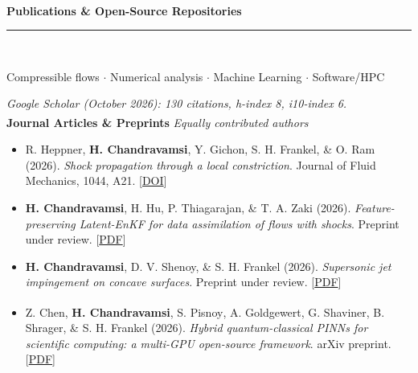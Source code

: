 \ \\[2mm]
\noindent \textbf{\large{Publications \& Open-Source Repositories}}\\[-2.5mm]
\noindent\rule{\textwidth}{0.4pt} \\[-5mm]
\begin{center}
    \noindent {} Compressible flows $\cdot$
     Numerical analysis $\cdot$ 
     Machine Learning $\cdot$
     Software/HPC \\
\end{center}

\noindent \textit{Google Scholar (October 2026): 130 citations, h-index 8, i10-index 6.}\\[0.5mm]

\noindent \textbf{Journal Articles \& Preprints} \hfill \textsuperscript{\textdagger}\textit{Equally contributed authors} \\

\begin{itemize}[itemsep=0pt, topsep=5pt, label=]
    \item R. Heppner, \textbf{H. Chandravamsi}, Y. Gichon, S. H. Frankel, \& O. Ram (2026). \textit{Shock propagation through a local constriction}. Journal of Fluid Mechanics, 1044, A21. [\href{https://doi.org/10.1017/jfm.2026.12130}{DOI}]
\end{itemize}

\begin{itemize}[itemsep=0pt, topsep=5pt, label=]
    \item \textbf{H. Chandravamsi}, H. Hu, P. Thiagarajan, \& T. A. Zaki (2026). \textit{Feature-preserving Latent-EnKF for data assimilation of flows with shocks}. Preprint under review. [\href{https://arxiv.org/pdf/2606.12559}{PDF}]
\end{itemize}

\begin{itemize}[itemsep=0pt, topsep=5pt, label=]
    \item \textbf{H. Chandravamsi}, D. V. Shenoy, \& S. H. Frankel (2026). \textit{Supersonic jet impingement on concave surfaces}. Preprint under review. [\href{https://arxiv.org/pdf/2608.01542}{PDF}]
\end{itemize}

\begin{itemize}[itemsep=0pt, topsep=5pt, label=]
    \item Z. Chen\textsuperscript{\textdagger}, \textbf{H. Chandravamsi}\textsuperscript{\textdagger}, S. Pisnoy\textsuperscript{\textdagger}, A. Goldgewert, G. Shaviner, B. Shrager, \& S. H. Frankel (2026). \textit{Hybrid quantum-classical PINNs for scientific computing: a multi-GPU open-source framework}. arXiv preprint. [\href{https://arxiv.org/pdf/2604.15645}{PDF}]
\end{itemize}

